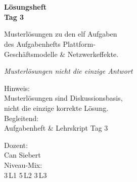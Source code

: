 \documentclass[11pt,a4paper,oneside]{article}
\newcommand{\caveatfontfallback}{\itshape}
\newcommand\caveatfont{\caveatfontfallback}%
\begin{document}
\begin{titlepage}
  \pagestyle{empty}
  \vspace*{1.5cm}
  \\[2pt]
  \noindent{\color{lpAccent}\rule{\linewidth}{1.2pt}}\\[4pt]

  \vspace{3cm}
  {\sffamily\fontsize{30}{34}\selectfont\bfseries\color{lpInk}Lösungsheft\\Tag 3\par}

  \vspace{0.7cm}
  {\sffamily\large\color{lpGray}Musterlösungen zu den elf Aufgaben\\des Aufgabenhefts \textendash{} Plattform-\\Geschäftsmodelle \& Netzwerkeffekte.\par}

  \vspace{1.5cm}
  {\caveatfont\LARGE\color{lpGreen}Musterlösungen \textperiodcentered{} nicht die einzige Antwort}\par

  \vfill

  \noindent\begin{minipage}{0.55\linewidth}
    {\sffamily\footnotesize\color{lpGray}Hinweis:}\\
    {\sffamily\small\color{lpInk}Musterlösungen sind Diskussionsbasis,\\nicht die einzige korrekte Lösung.}\\[10pt]
    {\sffamily\footnotesize\color{lpGray}Begleitend:}\\
    {\sffamily\small\color{lpInk}Aufgabenheft \& Lehrskript Tag 3}
  \end{minipage}\hfill
  \begin{minipage}{0.4\linewidth}
    \raggedleft
    {\sffamily\footnotesize\color{lpGray}Dozent:}\\
    {\sffamily\small\color{lpInk}Can Siebert}\\[10pt]
    {\sffamily\footnotesize\color{lpGray}Niveau-Mix:}\\
    {\sffamily\small\color{lpInk}3\,L1 \textperiodcentered{} 5\,L2 \textperiodcentered{} 3\,L3}
  \end{minipage}

  \vspace{0.5cm}
  \noindent{\color{lpAccent}\rule{\linewidth}{0.6pt}}
\end{titlepage}
\end{document}

